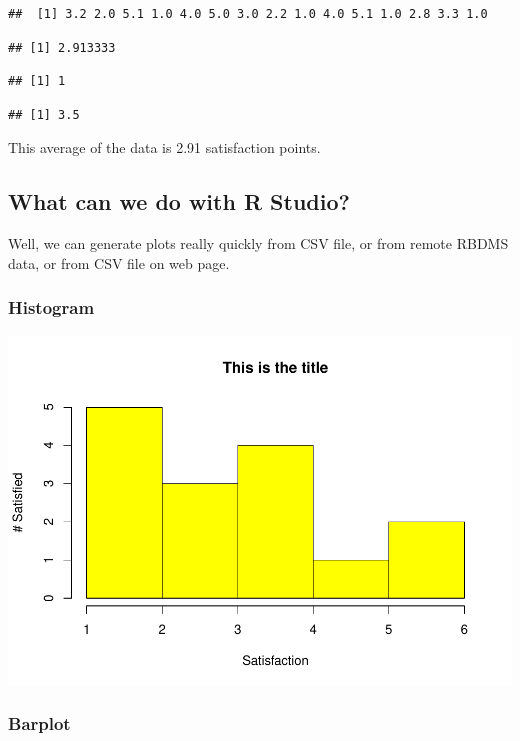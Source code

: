 \documentclass[
]{article}
\begin{document}
\begin{verbatim}
##  [1] 3.2 2.0 5.1 1.0 4.0 5.0 3.0 2.2 1.0 4.0 5.1 1.0 2.8 3.3 1.0
\end{verbatim}

\begin{verbatim}
## [1] 2.913333
\end{verbatim}

\begin{verbatim}
## [1] 1
\end{verbatim}

\begin{verbatim}
## [1] 3.5
\end{verbatim}

This average of the data is 2.91 satisfaction points.

\hypertarget{what-can-we-do-with-r-studio}{%
\subsection{What can we do with R
Studio?}\label{what-can-we-do-with-r-studio}}

Well, we can generate plots really quickly from CSV file, or from remote
RBDMS data, or from CSV file on web page.

\hypertarget{histogram}{%
\subsubsection{Histogram}\label{histogram}}

\includegraphics{3_StatisticsTerms_files/figure-latex/unnamed-chunk-2-1.pdf}

\hypertarget{barplot}{%
\subsubsection{Barplot}\label{barplot}}
\end{document}
